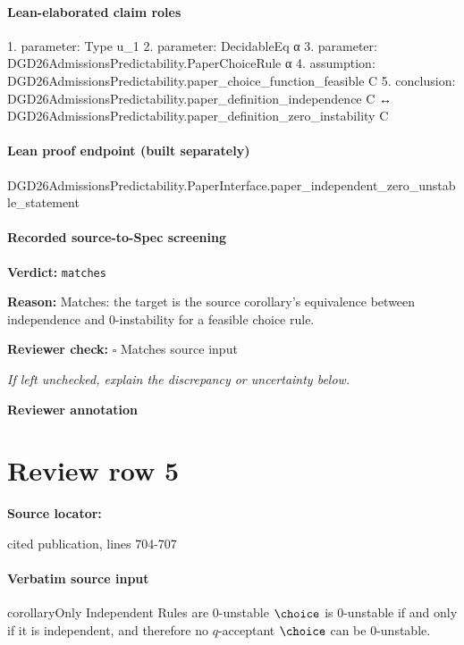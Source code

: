 \documentclass[10pt]{article}
\newcommand{\reviewerbox}{%
  \par\noindent\fbox{\parbox{0.96\linewidth}{\rule{0pt}{0.38in}}}\par
}
\newcommand{\reviewmatch}[1]{%
  \par\noindent\textbf{Reviewer check:} $\square$\; #1\par
  \noindent\emph{If left unchecked, explain the discrepancy or uncertainty below.}\par
}
\begin{document}
\paragraph{Lean-elaborated claim roles}\begin{ReviewVerbatim}
1. parameter: Type u_1
2. parameter: DecidableEq α
3. parameter: DGD26AdmissionsPredictability.PaperChoiceRule α
4. assumption: DGD26AdmissionsPredictability.paper_choice_function_feasible C
5. conclusion: DGD26AdmissionsPredictability.paper_definition_independence C ↔
  DGD26AdmissionsPredictability.paper_definition_zero_instability C
\end{ReviewVerbatim}

\paragraph{Lean proof endpoint (built separately)}\begin{ReviewVerbatim}
DGD26AdmissionsPredictability.PaperInterface.paper_independent_zero_unstable_statement
\end{ReviewVerbatim}

\paragraph{Recorded source-to-Spec screening}
\textbf{Verdict:} \texttt{matches}
\\
{\raggedright
\textbf{Reason:} Matches:\allowbreak{} the target is the source corollary's equivalence between independence and 0-\allowbreak{}instability for a feasible choice rule.\allowbreak{}
\par}
\reviewmatch{Matches source input}
\noindent\textbf{Reviewer annotation}\par
\reviewerbox
\clearpage
\hypertarget{source-claim-d920f9b7847b2baa}{}
\section*{Review row 5}
\textbf{Source locator:} {\footnotesize\raggedright cited publication, lines 704-\allowbreak{}707\par}
\paragraph{Verbatim source input}
\begin{ReviewVerbatim}
\begin{restatable}{corollary}{Only Independent Rules are 0-unstable}
\label{thm:independent-zero-unstable}
$\choice$ is $0$-unstable if and only if it is independent, and therefore no $q$-acceptant $\choice$ can be $0$-unstable.
\end{restatable}
\end{ReviewVerbatim}
\end{document}

